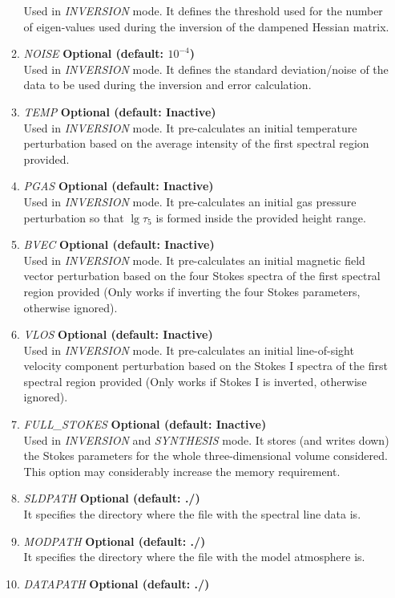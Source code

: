 \begin{itemize}
\begin{enumerate}
    Used in {\it INVERSION} mode. It defines the threshold used for the number of eigen-values used during the inversion of the dampened Hessian matrix.
    \item {\it NOISE} {\bf Optional (default: $10^{-4}$)}\\
    Used in {\it INVERSION} mode. It defines the standard deviation/noise of the data to be used during the inversion and error calculation.
    \item {\it TEMP} {\bf Optional (default: Inactive)}\\
    Used in {\it INVERSION} mode. It pre-calculates an initial temperature perturbation based on the average intensity of the first spectral region provided.
    \item {\it PGAS} {\bf Optional (default: Inactive)}\\
    Used in {\it INVERSION} mode. It pre-calculates an initial gas pressure perturbation so that $\lg\tau_{5}$ is formed inside the provided height range.
    \item {\it BVEC} {\bf Optional (default: Inactive)}\\
    Used in {\it INVERSION} mode. It pre-calculates an initial magnetic field vector perturbation based on the four Stokes spectra of the first spectral region provided (Only works if inverting the four Stokes parameters, otherwise ignored).
    \item {\it VLOS} {\bf Optional (default: Inactive)}\\
    Used in {\it INVERSION} mode. It pre-calculates an initial line-of-sight velocity component perturbation based on the Stokes I spectra of the first spectral region provided (Only works if Stokes I is inverted, otherwise ignored).
    \item {\it FULL\_STOKES} {\bf Optional (default: Inactive)}\\
    Used in {\it INVERSION} and {\it SYNTHESIS} mode. It stores (and writes down) the Stokes parameters for the whole three-dimensional volume considered. This option may considerably increase the memory requirement.
    \item {\it SLDPATH} {\bf Optional (default: ./)}\\
    It specifies the directory where the file with the spectral line data is.
    \item {\it MODPATH} {\bf Optional (default: ./)}\\
    It specifies the directory where the file with the model atmosphere is.
    \item {\it DATAPATH} {\bf Optional (default: ./)}\\

\end{enumerate}
\end{itemize}
